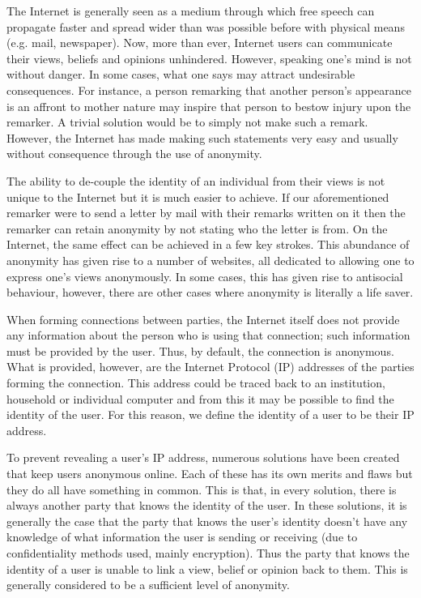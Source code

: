 \documentclass[ %
                    author={Luke Murray},
                supervisor={Dr. Simon Hollis},
                     title={Shadow Peer-to-Peer Networks},
                  subtitle={},
                    degree={MEng},
                      year={2013} ]{thesis}
\begin{document}

The Internet is generally seen as a medium through which free speech can propagate faster and spread wider than was possible before with physical means (e.g. mail, newspaper). Now, more than ever, Internet users can communicate their views, beliefs and opinions unhindered. However, speaking one's mind is not without danger. In some cases, what one says may attract undesirable consequences. For instance, a person remarking that another person's appearance is an affront to mother nature may inspire that person to bestow injury upon the remarker. A trivial solution would be to simply not make such a remark. However, the Internet has made making such statements very easy and usually without consequence through the use of anonymity.

The ability to de-couple the identity of an individual from their views is not unique to the Internet but it is much easier to achieve. If our aforementioned remarker were to send a letter by mail with their remarks written on it then the remarker can retain anonymity by not stating who the letter is from. On the Internet, the same effect can be achieved in a few key strokes. This abundance of anonymity has given rise to a number of websites, all dedicated to allowing one to express one's views anonymously. In some cases, this has given rise to antisocial behaviour, however, there are other cases where anonymity is literally a life saver.

When forming connections between parties, the Internet itself does not provide any information about the person who is using that connection; such information must be provided by the user. Thus, by default, the connection is anonymous. What is provided, however, are the Internet Protocol (IP) addresses of the parties forming the connection. This address could be traced back to an institution, household or individual computer and from this it may be possible to find the identity of the user. For this reason, we define the identity of a user to be their IP address. 

To prevent revealing a user's IP address, numerous solutions have been created that keep users anonymous online. Each of these has its own merits and flaws but they do all have something in common. This is that, in every solution, there is always another party that knows the identity of the user. In these solutions, it is generally the case that the party that knows the user's identity doesn't have any knowledge of what information the user is sending or receiving (due to confidentiality methods used, mainly encryption). Thus the party that knows the identity of a user is unable to link a view, belief or opinion back to them. This is generally considered to be a sufficient level of anonymity.
\end{document}
